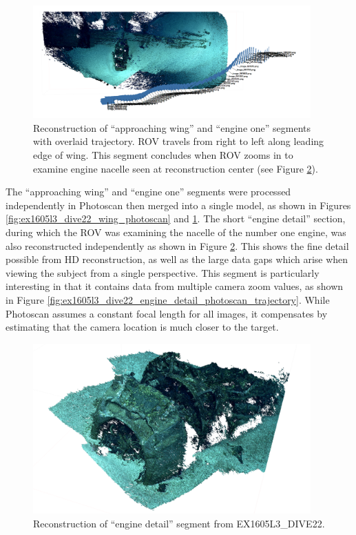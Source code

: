 \documentclass[letterpaper,12pt]{article}
\begin{document}
\begin{figure}
    \centering
    \includegraphics[width=0.95\textwidth]{images/approaching_wing_photoscan_trajectory.png}
    \caption{Reconstruction of ``approaching wing'' and ``engine one'' segments with overlaid trajectory.  ROV travels from right to left along leading edge of wing.   This segment concludes when ROV zooms in to examine engine nacelle seen at reconstruction center (see Figure \ref{fig:ex1605l3_dive22_engine_detail_photoscan}).}
    \label{fig:ex1605l3_dive22_wing_photoscan_trajectory}
\end{figure}

The ``approaching wing'' and ``engine one'' segments were processed independently in Photoscan then merged into a single model, as shown in Figures \ref{fig:ex1605l3_dive22_wing_photoscan} and \ref{fig:ex1605l3_dive22_wing_photoscan_trajectory}. 
The short ``engine detail'' section, during which the ROV was examining the nacelle of the number one engine, was also reconstructed independently as shown in Figure \ref{fig:ex1605l3_dive22_engine_detail_photoscan}.    This shows the fine detail possible from HD reconstruction, as well as the large data gaps which arise when viewing the subject from a single perspective.   This segment is particularly interesting in that it contains data from multiple camera zoom values, as shown in Figure \ref{fig:ex1605l3_dive22_engine_detail_photoscan_trajectory}.   While Photoscan assumes a constant focal length for all images, it compensates by estimating that the camera location is much closer to the target.


\begin{figure}
    \centering
    \includegraphics[width=0.95\textwidth]{images/engine_detail_photoscan.png}
    \caption{Reconstruction of ``engine detail'' segment from EX1605L3\_DIVE22.}
    \label{fig:ex1605l3_dive22_engine_detail_photoscan}
\end{figure}
\end{document}
